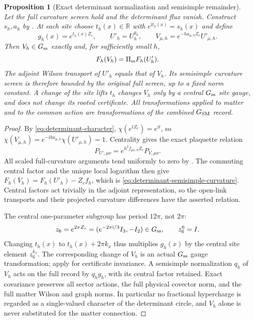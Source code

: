 \documentclass[11pt]{article}
\numberwithin{equation}{section}
\newtheorem{proposition}[proposition]{Proposition}
\theoremstyle{definition}
\theoremstyle{remark}
\newcommand{\R}{\mathbb R}
\newcommand{\ii}{\mathrm i}
\begin{document}
\begin{proposition}[Exact determinant normalization and semisimple remainder]
\label{prop:native-determinant-split}
Let the full curvature screen hold and the determinant flux vanish.
Construct $s_h,a_h$ by .
At each site choose $t_h(x)\in\R$ with $e^{\ii t_h(x)}=s_h(x)$ and define
\begin{equation}
 g_h(x)=e^{t_h(x)Z_c},\qquad
 U'_h=U_h^{g_h},\qquad
 V_{\mu,h}=e^{-h a_{\mu,h}Z_c}U'_{\mu,h}.
 \label{eq:determinant-exact-split}
\end{equation}
Then $V_h\in G_{\rm ss}$ exactly and, for sufficiently small $h$,
\begin{equation}
 F_h(V_h)=\Pi_{\rm ss}F_h(U'_h).
 \label{eq:determinant-semisimple-curvature}
\end{equation}
The adjoint Wilson transport of $U'_h$ equals that of $V_h$.  Its
semisimple curvature screen is therefore bounded by the original full
screen, up to a fixed norm constant.  A change of the site lifts $t_h$
changes $V_h$ only by a central $G_{\rm ss}$ site gauge, and does not change
its rooted certificate.  All transformations applied to matter and to the
common action are transformations of the combined $G_{\rm SM}$ record.
\end{proposition}
\begin{proof}
By \eqref{eq:determinant-character},
$\chi(e^{tZ_c})=e^{\ii t}$, so
$\chi(V_{\mu,h})=e^{-\ii h a_{\mu,h}}\chi(U'_{\mu,h})=1$.
Centrality gives the exact plaquette relation
\[
 P_{U',\mu\nu}=e^{h^2f_{\mu\nu,h}Z_c}P_{V,\mu\nu}.
\]
All scaled full-curvature arguments tend uniformly to zero by
.  The commuting central factor and the
unique local logarithm then give
$F_h(V_h)=F_h(U'_h)-Z_cf_h$, which is
\eqref{eq:determinant-semisimple-curvature}.  Central factors act trivially
in the adjoint representation, so the open-link transports and their
projected curvature differences have the asserted relation.

The central one-parameter subgroup has period $12\pi$, not $2\pi$:
\begin{equation}
 z_6=e^{2\pi Z_c}=(e^{-2\pi\ii/3}I_3,-I_2)\in G_{\rm ss},\qquad
 z_6^6=I.
 \label{eq:determinant-central-six}
\end{equation}
Changing $t_h(x)$ to $t_h(x)+2\pi k_x$ thus multiplies $g_h(x)$ by the
central site element $z_6^{k_x}$.  The corresponding change of $V_h$ is an
actual $G_{\rm ss}$ gauge transformation; apply
 for certificate invariance.  A
semisimple normalization $q_h$ of $V_h$ acts on the full record by
$q_hg_h$, with its central factor retained.  Exact covariance preserves
all sector actions, the full physical covector norm, and the full matter
Wilson and graph norms.  In particular no fractional hypercharge is
regarded as a single-valued character of the determinant circle, and $V_h$
alone is never substituted for the matter connection.
\end{proof}
\end{document}
